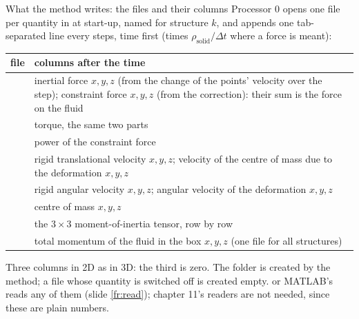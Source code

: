 \documentclass[aspectratio=169,11pt]{beamer}
\begin{document}
\begin{frame}{What the method writes: the files and their columns}
\label{fr:files}
\scriptsize Processor 0 opens one file per quantity in  at start-up, named  for structure $k$, and appends one tab-separated line every  steps, time first (times $\rho_{\mathrm{solid}}/\Delta t$ where a force is meant):
\begin{center}
\begin{tabular}{@{}lL{0.6\textwidth}@{}}
\toprule
file & columns after the time\\
\midrule
{} & inertial force $x, y, z$ (from the change of the points' velocity over the step); constraint force $x, y, z$ (from the correction): their sum is the force on the fluid\\
 & torque, the same two parts\\
 & power of the constraint force\\
 & rigid translational velocity $x, y, z$; velocity of the centre of mass due to the deformation $x, y, z$\\
 & rigid angular velocity $x, y, z$; angular velocity of the deformation $x, y, z$\\
 & centre of mass $x, y, z$\\
 & the $3\times3$ moment-of-inertia tensor, row by row\\
 & total momentum of the fluid in the box $x, y, z$ (one file for all structures)\\
\bottomrule
\end{tabular}
\end{center}
\scriptsize Three columns in 2D as in 3D: the third is zero. The folder is created by the method; a file whose quantity is switched off is created empty.  or MATLAB's  reads any of them (slide \ref{fr:read}); chapter 11's readers are not needed, since these are plain numbers.
\end{frame}
\end{document}
